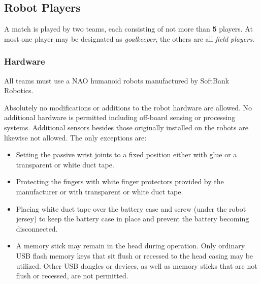 

\subsection{Robot Players}
\label{sec:robot_players}
A match is played by two teams, each consisting of not more than \textbf{5} players. At most one player may be designated as \emph{goalkeeper}, the others are all \emph{field players}.

\subsubsection{Hardware}
\label{sec:hardware}
All teams must use a NAO humanoid robots  manufactured by SoftBank Robotics.

Absolutely no modifications or additions to the robot hardware are allowed. No additional hardware is permitted including off-board sensing or processing systems. Additional sensors besides those originally installed on the robots are likewise not allowed. The only exceptions are:
\begin{itemize}
	\item Setting the passive wrist joints to a fixed position either with glue or a transparent or white duct tape.
	\item Protecting the fingers with white finger protectors provided by the manufacturer or with transparent or white duct tape.
	\item Placing white duct tape over the battery case and screw (under the robot jersey) to keep the battery case in place and prevent the battery becoming disconnected.
	\item A memory stick may remain in the head during operation.  Only ordinary USB flash memory keys that sit flush or recessed to the head casing may be utilized. Other USB dongles or devices, as well as memory sticks that are not flush or recessed, are not permitted.
\end{itemize}

